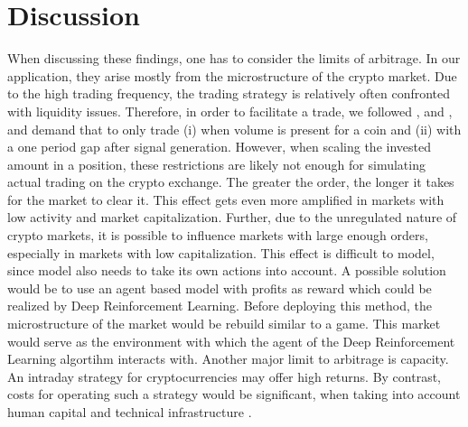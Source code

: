 \section{Discussion}


When discussing these findings, one has to consider the limits of arbitrage. 
In our application, they arise mostly from the microstructure of the crypto market. 
Due to the high trading frequency, the trading strategy is relatively often confronted with liquidity issues.
Therefore, in order to facilitate a trade, 
we followed \cite{gatev2006pairsTrading}, \cite{bowen2016equityMarket} and \cite{liu2015highFrequency}, 
and demand that to only trade (i) when volume is
present for a coin and (ii) with a one period gap after signal generation. 
However, when scaling the invested amount in a position, these restrictions are likely
not enough for simulating actual trading on the crypto exchange. 
The greater the order, the longer it takes for the market to clear it. 
This effect gets even more amplified in markets with low activity and market capitalization.
Further, due to the unregulated nature of crypto markets, 
it is possible to influence markets with large enough orders, 
especially in markets with low capitalization. 
This effect is difficult to model, since model also needs to take its own actions into account.
A possible solution would be to use an agent based model with profits as reward which 
could be realized by Deep Reinforcement Learning. 
Before deploying this method, the microstructure of the market would be rebuild similar to a game.
This market would serve as the environment with which the agent of the Deep Reinforcement Learning algortihm
interacts with.
Another major limit to arbitrage is capacity. An intraday
strategy for cryptocurrencies may offer high returns. By contrast, costs for operating
such a strategy would be significant, when taking into account human capital and
technical infrastructure \cite{krauss2019statisticalArbitrage}. 